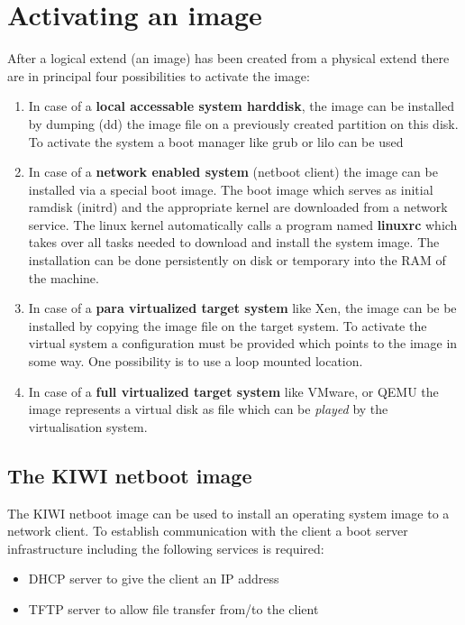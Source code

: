\chapter{Activating an image}
\label{activate}
\minitoc
After a logical extend (an image) has been created from a physical
extend there are in principal four possibilities to activate the
image:

\begin{enumerate}
	\item In case of a \textbf{local accessable system harddisk}, the image
          can be installed by dumping (dd) the image file on a previously
          created partition on this disk. To activate the system a boot
          manager like grub or lilo can be used
	\item In case of a \textbf{network enabled system} (netboot client)
          the image can be installed via a special boot image.
          The boot image which serves as initial ramdisk (initrd) and
          the appropriate kernel are downloaded from a network service.
          The linux kernel automatically calls a program named
          \textbf{linuxrc} which takes over all tasks needed to download
          and install the system image. The installation can be done
          persistently on disk or temporary into the RAM of the machine.
	\item In case of a \textbf{para virtualized target system} like Xen,
          the image can be be installed by copying the image file on the
          target system. To activate the virtual system a configuration
          must be provided which points to the image in some way. One
          possibility is to use a loop mounted location.
	\item In case of a \textbf{full virtualized target system} like VMware,
          or QEMU the image represents a virtual disk as file which can
          be \textit{played} by the virtualisation system.
\end{enumerate}

\section{The KIWI netboot image}

The KIWI netboot image can be used to install an operating system image to
a network client. To establish communication with the client a
boot server infrastructure including the following services is required:

\begin{itemize}
	\item DHCP server to give the client an IP address
	\item TFTP server to allow file transfer from/to the client 
\end{itemize}

